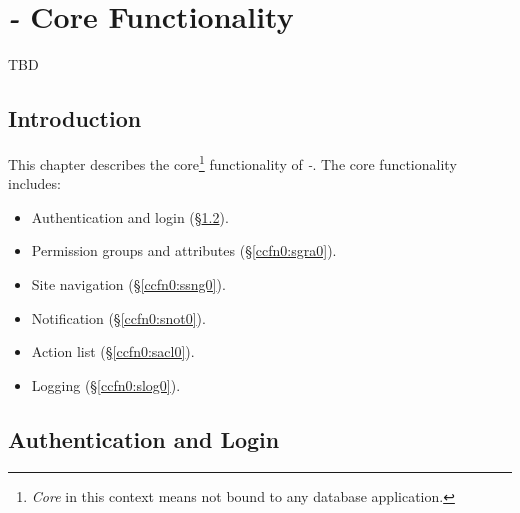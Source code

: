 
\chapter{\emph{\productbasename{}-\productversion{}} Core Functionality}

\label{ccfn0}

                  {TBD}


\section{Introduction}
\label{ccfn0:sint0}

This chapter describes the core\footnote{\emph{Core} in this context
means not bound to any database application.} functionality of 
\emph{\productbasename{}-\productversion{}}.  The core functionality
includes:

\begin{itemize}
\item Authentication and login (\S{}\ref{ccfn0:salg0}).
\item Permission groups and attributes (\S{}\ref{ccfn0:sgra0}).
\item Site navigation (\S{}\ref{ccfn0:ssng0}).
\item Notification (\S{}\ref{ccfn0:snot0}).
\item Action list (\S{}\ref{ccfn0:sacl0}).
\item Logging (\S{}\ref{ccfn0:slog0}).
\end{itemize}


\section{Authentication and Login}
\label{ccfn0:salg0}


